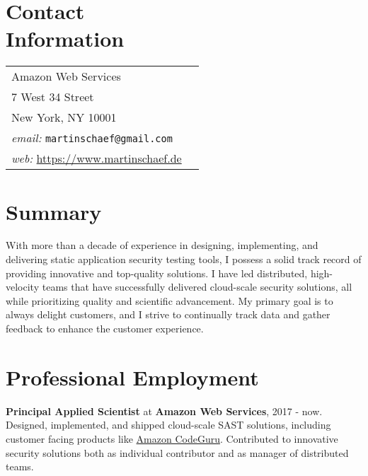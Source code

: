 \documentclass[margin,line]{res}
\begin{document}

\begin{resume}
\section{\sc Contact\\ Information}

\begin{tabular}{@{}p{3in}p{4in}}
Amazon Web Services  & \\%
7 West 34 Street &\\
New York, NY 10001 & \\
\emph{email:}  \texttt{martinschaef@gmail.com} & \\
\emph{web:} \url{https://www.martinschaef.de} & \\
\end{tabular}



%

\section{\sc Summary}
With more than a decade of experience in designing, implementing, and delivering static application security testing tools, 
I possess a solid track record of providing innovative and top-quality solutions. I have led distributed, high-velocity 
teams that have successfully delivered cloud-scale security solutions, all while prioritizing quality and scientific advancement. 
My primary goal is to always delight customers, and I strive to continually track data and gather feedback to enhance the customer experience.

\section{\sc Professional Employment}

\textbf{Principal Applied Scientist} at \textbf{Amazon Web Services}, 2017 - now.\\
Designed, implemented, and shipped cloud-scale SAST solutions, including customer facing products
like \href{https://aws.amazon.com/codeguru/}{Amazon CodeGuru}. Contributed to innovative security solutions both as individual contributor
and as manager of distributed teams.
 


\end{resume}
\end{document}
